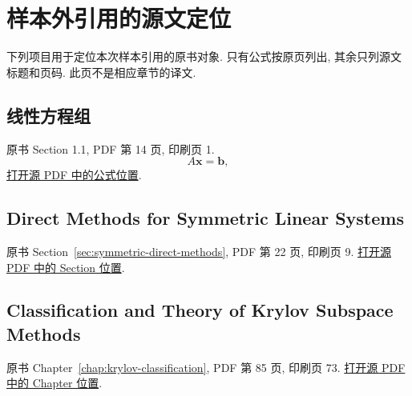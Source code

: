 \section*{样本外引用的源文定位}
\noindent 下列项目用于定位本次样本引用的原书对象. 只有公式按原页列出, 其余只列源文标题和页码. 此页不是相应章节的译文.

\subsection*{线性方程组}
\noindent 原书 Section 1.1, PDF 第 14 页, 印刷页 1.
\begingroup
\setcounter{equation}{0}
\begin{equation}\label{eq:linear-system}
A\bm x=\bm b,
\end{equation}
\endgroup
\noindent\href{run:../input/source/Krylov Subspace Methods for Linear Systems.pdf#page=14}{打开源 PDF 中的公式位置}.

\subsection*{Direct Methods for Symmetric Linear Systems}
\makeatletter
{}
\def\@currentlabel{1.4}\label{sec:symmetric-direct-methods}
\makeatother
\noindent 原书 Section~\ref{sec:symmetric-direct-methods}, PDF 第 22 页, 印刷页 9.
\href{run:../input/source/Krylov Subspace Methods for Linear Systems.pdf#page=22}{打开源 PDF 中的 Section 位置}.

\subsection*{Classification and Theory of Krylov Subspace Methods}
\makeatletter
{}
\def\@currentlabel{3}\label{chap:krylov-classification}
\makeatother
\noindent 原书 Chapter~\ref{chap:krylov-classification}, PDF 第 85 页, 印刷页 73.
\href{run:../input/source/Krylov Subspace Methods for Linear Systems.pdf#page=85}{打开源 PDF 中的 Chapter 位置}.
